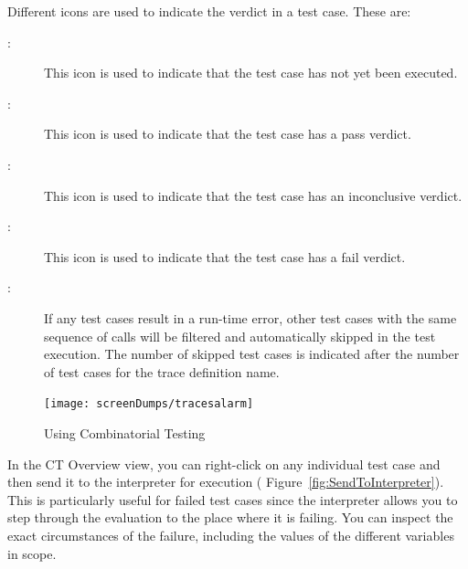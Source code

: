 \documentclass{overturerepchap}
\begin{document}
Different icons are used to indicate the verdict in a test
case. These are:
\begin{description}
\item[\hspace{-1.8mm}
:]
  This icon is used to indicate that the test case has not yet been
  executed.
\item[\hspace{-1.8mm}
:]
  This icon is used to indicate that the test case has a pass
  verdict.
\item[\hspace{-1.8mm}
:]
  This icon is used to indicate that the test case has an inconclusive
  verdict.
\item[\hspace{-1.8mm}
:]
  This icon is used to indicate that the test case has a fail
  verdict.
\item[\hspace{-1.8mm}
:]
If any test cases result in a run-time error, other test cases with the
same sequence of calls will be filtered and automatically skipped in the test
execution. The number of skipped test cases is indicated after the number
of test cases for the trace definition name.
\end{description}

\begin{figure}[htbp]
\begin{center}
\texttt{[image: screenDumps/tracesalarm]}
\caption{Using Combinatorial Testing\label{fig:tracesalarm}}
\end{center}
\end{figure}

In the CT Overview view, you can right-click on any individual
test case and then send it to the interpreter for execution (\see
Figure~\ref{fig:SendToInterpreter}). This is particularly useful for
failed test cases since the interpreter allows you to step through the
evaluation to the place where it is failing. You can inspect the exact
circumstances of the failure, including the values of the different
variables in scope.
\end{document}
